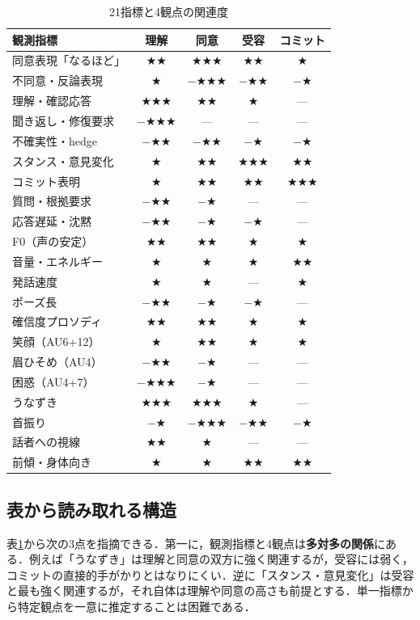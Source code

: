 \documentclass[Japanese]{dicomopapers}
\begin{document}
\begin{table}[t]
\centering
\caption{21指標と4観点の関連度}
\label{tab:matching}
\scriptsize
\begin{tabular}{lcccc}
\hline
観測指標 & 理解 & 同意 & 受容 & コミット \\
\hline
同意表現「なるほど」 & ★★ & ★★★ & ★★ & ★ \\
不同意・反論表現 & ★ & $-$★★★ & $-$★★ & $-$★ \\
理解・確認応答 & ★★★ & ★★ & ★ & --- \\
聞き返し・修復要求 & $-$★★★ & --- & --- & --- \\
不確実性・hedge & $-$★★ & $-$★★ & $-$★ & $-$★ \\
スタンス・意見変化 & ★ & ★★ & ★★★ & ★★ \\
コミット表明 & ★ & ★★ & ★★ & ★★★ \\
\hline
質問・根拠要求 & $-$★★ & $-$★ & --- & --- \\
応答遅延・沈黙 & $-$★★ & $-$★ & $-$★ & --- \\
\hline
F0（声の安定） & ★★ & ★★ & ★ & ★ \\
音量・エネルギー & ★ & ★ & ★ & ★★ \\
発話速度 & ★ & ★ & --- & ★ \\
ポーズ長 & $-$★★ & $-$★ & $-$★ & --- \\
確信度プロソディ & ★★ & ★★ & ★ & ★ \\
\hline
笑顔（AU6+12） & ★ & ★★ & ★ & ★ \\
眉ひそめ（AU4） & $-$★★ & $-$★ & --- & --- \\
困惑（AU4+7） & $-$★★★ & $-$★ & --- & --- \\
\hline
うなずき & ★★★ & ★★★ & ★ & --- \\
首振り & $-$★ & $-$★★★ & $-$★★ & $-$★ \\
話者への視線 & ★★ & ★ & --- & --- \\
前傾・身体向き & ★ & ★ & ★★ & ★★ \\
\hline
\end{tabular}
\end{table}

\subsection{表から読み取れる構造}

表\ref{tab:matching}から次の3点を指摘できる．第一に，観測指標と4観点は\textbf{多対多の関係}にある．例えば「うなずき」は理解と同意の双方に強く関連するが，受容には弱く，コミットの直接的手がかりとはなりにくい．逆に「スタンス・意見変化」は受容と最も強く関連するが，それ自体は理解や同意の高さも前提とする．単一指標から特定観点を一意に推定することは困難である．
\end{document}
